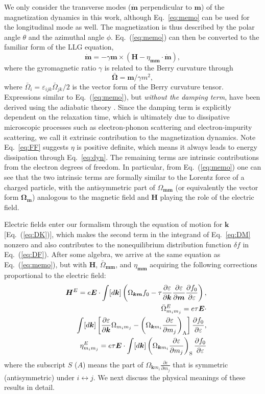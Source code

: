 \documentclass[aps,prb,twocolumn,showpacs,superscriptaddress]{revtex4-1}
\def\be{\begin{equation}} \def\ee{\end{equation}}
\def\bea{\begin{eqnarray}} \def\eea{\end{eqnarray}}
\def\fracp#1#2{\frac{\partial #1}{\partial #2}}
\begin{document}
We only consider the transverse modes ($\dot{\bm m}$ perpendicular to $\bm m$) of the magnetization dynamics in this work, although Eq.~\ref{eq:memo} can be used for the longitudinal mode as well. The magnetization is thus described by the polar angle $\theta$ and the azimuthal angle $\phi$. Eq.~(\ref{eq:memo}) can then be converted to the familiar form of the LLG equation,
\be
\dot{\bm{m}} = - \gamma \bm{m}\times \left({\bm{H} - \eta_{\bm{m}\bm{m}} \cdot \dot{\bm{m}}}\right), \label{eq:dyn}
\ee
where the gyromagnetic ratio $\gamma$ is related to the Berry curvature through
\be
\bar{\bm{\Omega}} =  \bm{m}/ {\gamma m^2},  \label{eq:gamma}
\ee
where $\bar{\Omega}_i = \varepsilon_{ijk} \bar{\Omega}_{jk}/2$ is the vector form of the Berry curvature tensor. Expressions similar to Eq.~(\ref{eq:memo}), but \emph{without the damping term}, have been derived using the adiabatic theory \cite{niu:1998spin}. Since the damping term is explicitly dependent on the relaxation time, which is ultimately due to dissipative microscopic processes such as electron-phonon scattering and electron-impurity scattering, we call it extrinsic contribution to the magnetization dynamics. Note Eq.~\ref{eq:FF} suggests $\eta$ is positive definite, which means it always leads to energy dissipation through Eq.~\ref{eq:dyn}. The remaining terms are intrinsic contributions from the electron degrees of freedom. In particular, from Eq.~(\ref{eq:memo}) one can see that the two intrinsic terms are formally similar to the Lorentz force of a charged particle, with the antisymmetric part of $\Omega_{\bm{m}\bm{m}}$ (or equivalently the vector form $\bm \Omega_{\bm{m}}$) analogous to the magnetic field and $\bm H$ playing the role of the electric field. 

Electric fields enter our formalism through the equation of motion for $\bm k$ [Eq.~(\ref{eq:DK})], which makes the second term in the integrand of Eq.~\ref{eq:DM} nonzero and also contributes to the nonequilibrium distribution function $\delta f$ in  Eq.~(\ref{eq:DF}). After some algebra, we arrive at the same equation as Eq.~(\ref{eq:memo}), but with $\bm H$, $\bar{\Omega}_{\bm m \bm m}$, and $\eta_{\bm m \bm m}$ acquiring the following corrections proportional to the electric field:
 \bea
&&\bm{H}^E=e \bm{E}\cdot  \int [d\bm{k}]\left( \Omega_{\bm{k}\bm{m}}f_0 -\tau\fracp{\varepsilon}{\bm{k}} \fracp{\varepsilon}{\bm{m}} \fracp{f_0}{\varepsilon} \right ),\label{eq:HE}\\
&&\bar{\Omega}_{m_im_j}^E =  e\tau \bm E \cdot  \\\nonumber
&&\;\; \int [d\bm{k}] \left [  \fracp{\varepsilon}{\bm{k}}   \Omega_{m_im_j} - \left ( \Omega_{\bm{k}m_i} \fracp{\varepsilon}{m_j}\right)_{\rm A}\right ]\fracp{f_0}{\varepsilon}, \label{eq:domegaE}\\
&& \eta_{m_im_j}^E =  e\tau \bm E \cdot \int [d\bm{k}] \left ( \Omega_{\bm{k}m_i} \fracp{\varepsilon}{m_j} \right)_{\rm S}\fracp{f_0}{\varepsilon} \label{eq:detaE}
 \eea
where the subscript $S$ ($A$) means the part of $ \Omega_{\bm{k}m_i} \fracp{\varepsilon}{m_j}$ that is symmetric (antisymmetric) under $i\leftrightarrow j$. We next discuss the physical meanings of these results in detail.
\end{document}
